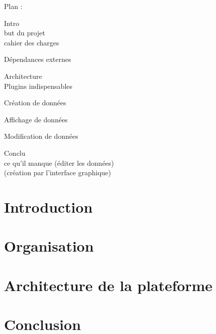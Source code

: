 \documentclass[a4paper]{report}
\begin{document}



\tableofcontents

Plan : 

	Intro\\
		but du projet\\
		cahier des charges

	Dépendances externes

	Architecture  \\
		Plugins indispensables

		Création de données

		Affichage de données

		Modification de données

	Conclu\\
		ce qu'il manque (éditer les données)\\
		(création par l'interface graphique)

	
\chapter*{Introduction}



\chapter{Organisation}

	

\chapter{Architecture de la plateforme}



\chapter*{Conclusion}
%
\end{document}

